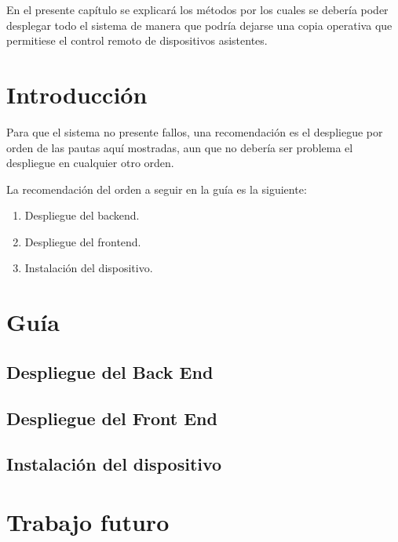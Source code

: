 
En el presente capítulo se explicará los métodos por los cuales se debería poder desplegar todo el sistema de manera que podría dejarse una copia operativa que permitiese el control remoto de dispositivos asistentes.

\section{Introducción}

    Para que el sistema no presente fallos, una recomendación es el despliegue por orden de las pautas aquí mostradas, aun que no debería ser problema el despliegue en cualquier otro orden.

    La recomendación del orden a seguir en la guía es la siguiente:
    
    \begin{enumerate}
    
        \item Despliegue del backend.
        
        \item Despliegue del frontend.
        
        \item Instalación del dispositivo.
        
    \end{enumerate}
\newpage
\section{Guía}
\subsection{ Despliegue del Back End}
    
    
\subsection{ Despliegue del Front End}
    
    
\subsection{ Instalación del dispositivo}
    


\newpage
\section{Trabajo futuro}

 
